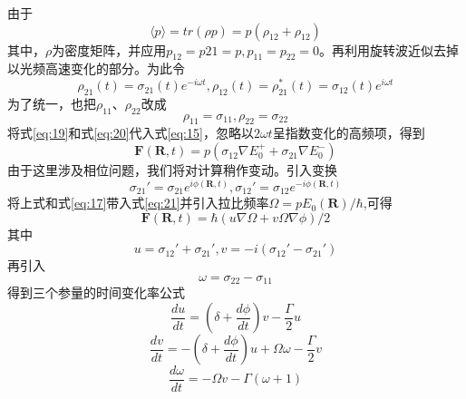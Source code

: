 \documentclass{article}
\begin{document}
	由于
	\begin{equation}
		\langle p \rangle = tr(\rho p) = p(\rho_{12} + \rho_{12}) \label{eq:18}
	\end{equation}
	其中，$\rho$为密度矩阵，并应用$p_{12} = p{21} = p,p_{11} = p_{22} = 0$。再利用旋转波近似去掉以光频高速变化的部分。为此令
	\begin{equation}
		\rho_{21}(t) = \sigma_{21}(t)e^{-i\omega t}, \rho_{12}(t) = \rho_{21}^*(t) = \sigma_{12}(t)e^{i \omega t} \label{eq:19}
	\end{equation}
	为了统一，也把$\rho_{11}$、$\rho_{22}$改成
	\begin{equation}
		\rho_{11} = \sigma_{11}, \rho_{22} = \sigma_{22} \label{eq:20}
	\end{equation}
	将式\ref{eq:19}和式\ref{eq:20}代入式\ref{eq:15}，忽略以$2\omega t$呈指数变化的高频项，得到
	\begin{equation}
		\boldsymbol{F}(\boldsymbol{R},t) = p(\sigma_{12} \nabla E_0^+ + \sigma_{21} \nabla E_0^-) \label{eq:21}
	\end{equation}
	由于这里涉及相位问题，我们将对计算稍作变动。引入变换
	\begin{equation}
		\sigma_{21}'= \sigma_{21} e^{i\phi(\boldsymbol{R},t)}, \sigma_{12}'= \sigma_{12} e^{-i\phi(\boldsymbol{R},t)} \label{eq:22}
	\end{equation}
	将上式和式\ref{eq:17}带入式\ref{eq:21}并引入拉比频率$\Omega = pE_0(\boldsymbol{R})/\hbar$,可得
	\begin{equation}
		\boldsymbol{F}(\boldsymbol{R},t) = \hbar (u\nabla \Omega + v\Omega \nabla \phi)/2 \label{eq:23}
	\end{equation}
	其中
	\begin{equation}
		u = \sigma_{12}' + \sigma_{21}', v = -i(\sigma_{12}' - \sigma_{21}')
	\end{equation}
	再引入
	\begin{equation}
		\omega = \sigma_{22} - \sigma_{11}
	\end{equation}
	得到三个参量的时间变化率公式
	\begin{equation}
		\frac{du}{dt} = (\delta + \frac{d\phi}{dt})v - \frac{\Gamma}{2}u 
	\end{equation}
	\begin{equation}
		\frac{dv}{dt} = -(\delta + \frac{d\phi}{dt})u + \Omega\omega - \frac{\Gamma}{2}v 
	\end{equation}
	\begin{equation}
		\frac{d\omega}{dt} = - \Omega v - \Gamma(\omega + 1)
	\end{equation}
\end{document}
